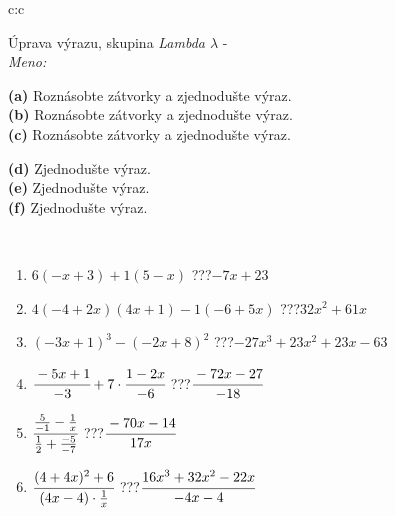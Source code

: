 \documentclass[10pt]{report}
\begin{document}
\newpage
\thispagestyle{empty}
\begin{tabular}{c:c}
\begin{minipage}[c][104.5mm][t]{0.5\linewidth}
\begin{center}
\vspace{7mm}
{\huge Úprava výrazu, skupina \textit{Lambda $\lambda$} -}\\[5mm]
\textit{Meno:}\phantom{xxxxxxxxxxxxxxxxxxxxxxxxxxxxxxxxxxxxxxxxxxxxxxxxxxxxxxxxxxxxxxxxx}\\[5mm]
\begin{minipage}{0.95\linewidth}
\begin{center}
{\small \begin{minipage}{0.6\textwidth}
\textbf{(a)} Roznásobte zátvorky a zjednodušte výraz. \\[1mm]
\textbf{(b)} Roznásobte zátvorky a zjednodušte výraz. \\[1mm]
\textbf{(c)} Roznásobte zátvorky a zjednodušte výraz.
\end{minipage} \begin{minipage}{0.39\textwidth}
\textbf{(d)} Zjednodušte výraz. \\[1mm]
\textbf{(e)} Zjednodušte výraz. \\[1mm]
\textbf{(f)} Zjednodušte výraz.
\end{minipage}
}
\end{center}
\end{minipage}
\\[4mm]
\begin{minipage}{0.79\linewidth}
\begin{center}
\begin{varwidth}{\linewidth}
\begin{enumerate}
\normalsize
\item $6(-x+3)+1(5-x)$\quad \dotfill\; ???\;\dotfill \quad $-7x+23$
\item $4(-4+2x)(4x+1)-1(-6+5x)$\quad \dotfill\; ???\;\dotfill \quad $32x^2+61x$
\item $(-3x+1)^3-(-2x+8)^2$\quad \dotfill\; ???\;\dotfill \quad $-27x^3+23x^2+23x-63$
\item $\cfrac{-5x+1}{-3}+7\cdot\cfrac{1-2x}{-6}$\quad \dotfill\; ???\;\dotfill \quad $\cfrac{-72x-27}{-18}$
\item $\cfrac{\frac{5}{-1}-\frac{1}{x}}{\frac{1}{2}+\frac{-5}{-7}}$\quad \dotfill\; ???\;\dotfill \quad $\cfrac{-70x-14}{17x}$
\item $\cfrac{(4+4x)^2+6}{(4x-4)\cdot\frac{1}{x}}$\quad \dotfill\; ???\;\dotfill \quad $\cfrac{16x^3+32x^2-22x}{-4x-4}$

\end{enumerate}
\end{varwidth}
\end{center}
\end{minipage}
\end{center}
\end{minipage}
\end{tabular}
\end{document}
